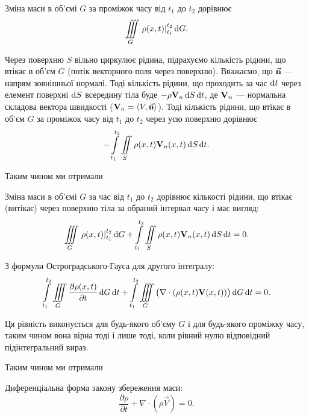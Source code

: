 Зміна маси в об'ємі $G$ за проміжок часу від $t_1$ до $t_2$ дорівнює 
\begin{equation}
	\Iiint_G \left. \rho(x, t) \right|_{t_1}^{t_2} \diff G.
\end{equation}

Через поверхню $S$ вільно циркулює рідина, підрахуємо кількість рідини, що втікає в об'єм $G$ (потік векторного поля через поверхню). Вважаємо, що $\vec{\bf{n}}$ --- напрям зовнішньої нормалі. Тоді кількість рідини, що проходить за час $\diff t$ через елемент поверхні $\diff S$ всередину тіла буде $- \rho \bf{V}_n \diff S \diff t$, де $\bf{V}_n$ --- нормальна складова вектора швидкості ($\bf{V}_n = \langle V, \vec{\bf{n}} \rangle$). Тоді кількість рідини, що втікає в об'єм $G$ за проміжок часу від $t_1$ до $t_2$ через усю поверхню дорівнює
\begin{equation}
	-\Int_{t_1}^{t_2} \Iint_S \rho(x, t) \bf{V}_n(x, t) \diff S \diff t.
\end{equation}

Таким чином ми отримали
\begin{law}
	\label{laq:mass-conservation}
	Зміна маси в об'ємі $G$ за час від $t_1$ до $t_2$ дорівнює кількості рідини, що втікає (витікає) через поверхню тіла за обраний інтервал часу і має вигляд:
	\begin{equation}
		\Iiint_G \left. \rho(x, t) \right|_{t_1}^{t_2} \diff G + \Int_{t_1}^{t_2} \Iint_S \rho(x, t) \bf{V}_n(x, t) \diff S \diff t = 0.
	\end{equation}
\end{law}

З формули Остроградського-Гауса для другого інтегралу:
\begin{equation}
	\Int_{t_1}^{t_2} \Iiint_G \frac{\partial \rho(x, t)}{\partial t} \diff G \diff t+ \Int_{t_1}^{t_2} \Iiint_G \big( \nabla \cdot ( \rho(x, t) \bf{V}(x, t)) \big) \diff G \diff t = 0.
\end{equation}

Ця рівність виконується для будь-якого об'єму $G$ і для будь-якого проміжку часу, таким чином вона вірна тоді і лише тоді, коли рівний нулю відповідний підінтегральний вираз. \medskip

Таким чином ми отримали
\begin{th_equation}[нерозривності]
	Диференціальна форма закону збереження маси:
	\begin{equation}
		\frac{\partial \rho}{\partial t} + \nabla \cdot \left( \rho \vec V \right) = 0.
	\end{equation}
\end{th_equation}

